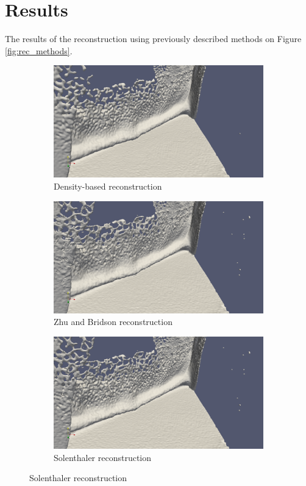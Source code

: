 \section{Results}

The results of the reconstruction using previously described methods on Figure \ref{fig:rec_methods}.
\begin{figure}[H]
	\begin{subfigure}[b]{\textwidth}
		\includegraphics[width=\textwidth]{figures/DencityBasedReconstruction.png}
		\caption{Density-based reconstruction \cite{DencRec}}
	\end{subfigure}
	\begin{subfigure}[b]{\textwidth}
		\includegraphics[width=\textwidth]{figures/ZhuBridsonReconstruction.png}
		\caption{Zhu and Bridson reconstruction \cite{ZhuBridson}}

	\end{subfigure}
	\begin{subfigure}[b]{\textwidth}
		\includegraphics[width=\textwidth]{figures/SolenthilerReconstruction.png}
		\caption{Solenthaler reconstruction \cite{Solenthaler}}


\end{subfigure}
\end{figure}

